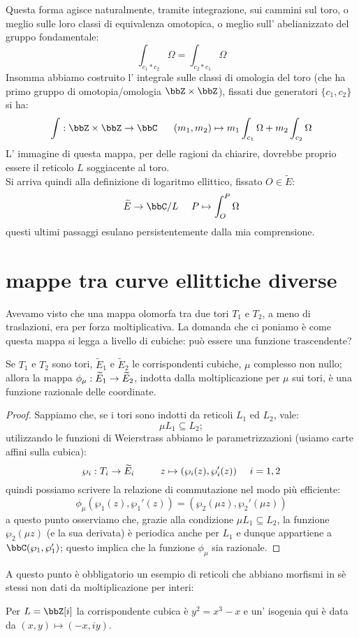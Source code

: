 Questa forma agisce naturalmente, tramite integrazione, sui cammini sul toro, o meglio sulle loro classi di equivalenza omotopica, o meglio sull' abelianizzato del gruppo fondamentale:
$$
\int_{c_1 * c_2} \Omega=\int_{c_2 * c_1} \Omega
$$
Insomma abbiamo costruito l' integrale sulle classi di omologia del toro (che ha primo gruppo di omotopia/omologia $\bbZ\times \bbZ $), fissati due generatori $\{c_1,c_2\}$ si ha:
$$
\int: \bbZ\times \bbZ \rar \bbC \ \ \ \ \ (m_1,m_2)\mapsto m_1 \int_{c_1} \Omega+m_2 \int_{c_2} \Omega
$$
L' immagine di questa mappa, per delle ragioni da chiarire, dovrebbe proprio essere il reticolo $L$ soggiacente al toro.\\
Si arriva quindi alla definizione di logaritmo ellittico, fissato $O\in \widetilde{E}$:
$$
\widetilde{E}\rar \bbC/L\ \ \ \ P\mapsto \int_O^P \Omega
$$
questi ultimi passaggi esulano persistentemente dalla mia comprensione.
\section{mappe tra curve ellittiche diverse}
Avevamo visto che una mappa olomorfa tra due tori $T_1$ e $T_2$, a meno di traslazioni, era per forza moltiplicativa. La domanda che ci poniamo è come questa mappa si legga a livello di cubiche: può essere una funzione trascendente?
\begin{proposizione}
Se $T_1$ e $T_2$ sono tori, $\widetilde{E}_1$ e $\widetilde{E}_2$ le corrispondenti cubiche, $\mu$ complesso non nullo; allora la mappa $\phi_\mu:\widetilde{E}_1\rightarrow\widetilde{E}_2$, indotta dalla moltiplicazione per $\mu$ sui tori, è una funzione razionale delle coordinate.
\end{proposizione}
\begin{proof}
Sappiamo che, se i tori sono indotti da reticoli $L_1$ ed $L_2$, vale:
$$
\mu L_1\subseteq L_2;
$$
utilizzando le funzioni di Weierstrass abbiamo le parametrizzazioni (usiamo carte affini sulla cubica):
$$
\wp_i:T_i\rightarrow \widetilde{E}_i \qquad \ \ z \mapsto (\wp_i(z),\wp_i'(z))\ \ \ \ i=1,2
$$
quindi possiamo scrivere la relazione di commutazione nel modo più efficiente:
$$
\phi_\mu(\wp_1(z),\wp_1'(z))=(\wp_2(\mu z),\wp_2'(\mu z))
$$
a questo punto osserviamo che, grazie alla condizione $\mu L_1\subseteq L_2$, la funzione $\wp_2(\mu z)$ (e la sua derivata) è periodica anche per $L_1$ e dunque appartiene a $\bbC(\wp_1,\wp_1')$; questo implica che la funzione $\phi_\mu$ sia razionale.
\end{proof}
A questo punto è obbligatorio un esempio di reticoli che abbiano morfismi in sè stessi non dati da moltiplicazione per interi:
\begin{fatto}
Per $L=\bbZ[i]$ la corrispondente cubica è $y^2=x^3-x$ e un' isogenia qui è data da $(x,y)\mapsto (-x,iy)$.
\end{fatto}

